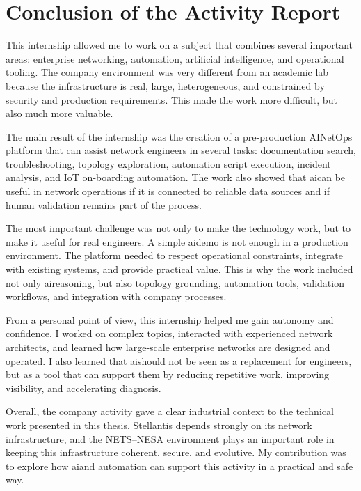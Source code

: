 \documentclass[11pt,a4paper]{report}
\begin{document}
\section{Conclusion of the Activity Report}

This internship allowed me to work on a subject that combines several important areas: enterprise networking, automation, artificial intelligence, and operational tooling. The company environment was very different from an academic lab because the infrastructure is real, large, heterogeneous, and constrained by security and production requirements. This made the work more difficult, but also much more valuable.

The main result of the internship was the creation of a pre-production \gls{AINetOps} platform that can assist network engineers in several tasks: documentation search, troubleshooting, topology exploration, automation script execution, incident analysis, and IoT on-boarding automation. The work also showed that \gls{ai}can be useful in network operations if it is connected to reliable data sources and if human validation remains part of the process.

The most important challenge was not only to make the technology work, but to make it useful for real engineers. A simple \gls{ai}demo is not enough in a production environment. The platform needed to respect operational constraints, integrate with existing systems, and provide practical value. This is why the work included not only \gls{ai}reasoning, but also topology \gls{grounding}, automation tools, validation workflows, and integration with company processes.

From a personal point of view, this internship helped me gain autonomy and confidence. I worked on complex topics, interacted with experienced network architects, and learned how large-scale enterprise networks are designed and operated. I also learned that \gls{ai}should not be seen as a replacement for engineers, but as a tool that can support them by reducing repetitive work, improving visibility, and accelerating diagnosis.

Overall, the company activity gave a clear industrial context to the technical work presented in this thesis. Stellantis depends strongly on its network infrastructure, and the NETS--NESA environment plays an important role in keeping this infrastructure coherent, secure, and evolutive. My contribution was to explore how \gls{ai}and automation can support this activity in a practical and safe way.
\end{document}
